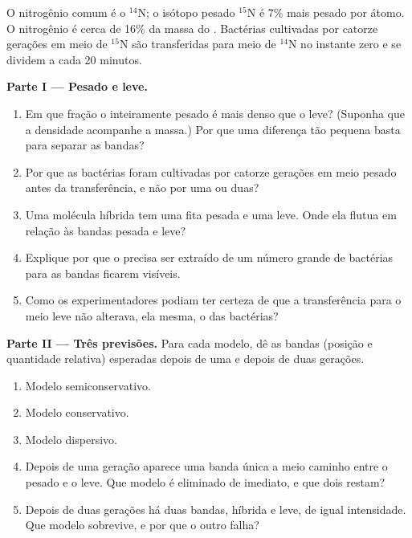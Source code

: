 \begin{problem}
\label{pb:g11:dna-replication:1}
O nitrogênio comum é o $^{14}$N; o isótopo pesado $^{15}$N é 7\% mais
pesado por átomo. O nitrogênio é cerca de 16\% da massa do .
Bactérias cultivadas por catorze gerações em meio de $^{15}$N são
transferidas para meio de $^{14}$N no instante zero e se dividem a cada
20 minutos.

\medskip
\noindent\textbf{Parte I --- Pesado e leve.}
\begin{enumerate}
  \item Em que fração o  inteiramente pesado é mais denso que o 
        leve? (Suponha que a densidade acompanhe a massa.) Por que uma
        diferença tão pequena basta para separar as bandas?
  \item Por que as bactérias foram cultivadas por catorze gerações em
        meio pesado antes da transferência, e não por uma ou duas?
  \item Uma molécula híbrida tem uma fita pesada e uma leve. Onde ela
        flutua em relação às bandas pesada e leve?
  \item Explique por que o  precisa ser extraído de um número
        grande de bactérias para as bandas ficarem visíveis.
  \item Como os experimentadores podiam ter certeza de que a
        transferência para o meio leve não alterava, ela mesma, o 
        das bactérias?
\end{enumerate}

\medskip
\noindent\textbf{Parte II --- Três previsões.}
Para cada modelo, dê as bandas (posição e quantidade relativa)
esperadas depois de uma e depois de duas gerações.
\begin{enumerate}[resume]
  \item Modelo semiconservativo.
  \item Modelo conservativo.
  \item Modelo dispersivo.
  \item Depois de uma geração aparece uma banda única a meio caminho
        entre o pesado e o leve. Que modelo é eliminado de imediato, e
        que dois restam?
  \item Depois de duas gerações há duas bandas, híbrida e leve, de
        igual intensidade. Que modelo sobrevive, e por que o outro
        falha?
\end{enumerate}


\end{problem}
